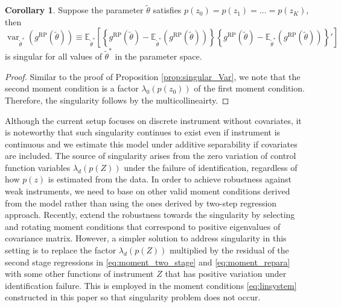 \documentclass[11pt]{article}
\theoremstyle{definition}
\newtheorem{corollary}{Corollary}[section]
\DeclareMathOperator{\var}{var}
\newcommand{\Exp}{\ensuremath{\mathbb{E}}} %
\newcommand{\0}{\ensuremath{\mathbf{0}}}
\begin{document}
\begin{bibunit}
\begin{corollary}
Suppose the parameter $\tilde{\theta}$ satisfies $p(z_0) = p(z_1) = \ldots = p(z_K)$, then 
\[
    \var_{\tilde{\theta}^*} (g^{\text{RP}}(\tilde{\theta})) \equiv 
    \Exp_{\tilde{\theta}^*}\left[\left\{g^{\text{RP}}(\tilde{\theta}) - \Exp_{\tilde{\theta}^*}(g^{\text{RP}}(\tilde{\theta}))\right\}\left\{g^{\text{RP}}(\tilde{\theta}) - \Exp_{\tilde{\theta}^*}(g^{\text{RP}}(\tilde{\theta}))\right\}'\right]
\]
is singular for all values of $\tilde{\theta}^*$ in the parameter space.
\end{corollary}
\begin{proof}
Similar to the proof of Proposition \ref{prop:singular_Var}, we note that the second moment condition is a factor $\lambda_0(p(z_0))$ of the first moment condition. Therefore, the singularity follows by the multicollineairty. 
\end{proof}

Although the current setup focuses on discrete instrument without covariates, it is noteworthy that such singularity continues to exist even if instrument is continuous and we estimate this model under additive separability if covariates are included. The source of singularity arises from the zero variation of control function variables $\lambda_d(p(Z))$ under the failure of identification, regardless of how $p(z)$ is estimated from the data. In order to achieve robustness against weak instruments, we need to base on other valid moment conditions derived from the model rather than using the ones derived by two-step regression approach. Recently, \cite{andrews/guggenberger:2019} extend the robustness towards the singularity by selecting and rotating moment conditions that correspond to positive eigenvalues of covariance matrix. However, a simpler solution to address singularity in this setting is to replace the factor $\lambda_d(p(Z))$ multiplied by the residual of the second stage regressions in \eqref{eq:moment_two_stage} and \eqref{eq:moment_repara} with some other functions of instrument $Z$ that has positive variation under identification failure. This is employed in the moment conditions \eqref{eq:linsystem} constructed in this paper so that singularity problem does not occur.

%
%


%


%
%
%
%
%
%
%
%
%
%
%
%
%
%
%
%
%
%


%

%
%
%
%
%
%
%
%
%
%
%
%
%
%
%
%
%
%
%
%
%
%
%
%
%
%
%
%
%
%
%
%


%
%
%
%
%
%
%
%
%
%
%
%
%
%
%
%
%


\putbib
\end{bibunit}
\end{document}
